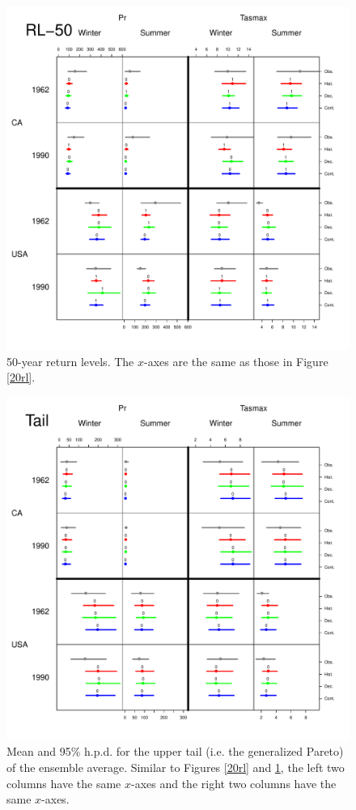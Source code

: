 \documentclass[12pt]{article}
\begin{document}
\begin{figure}
\begin{center}
\includegraphics[scale=0.72]{figs/rl50.pdf}
\end{center}
\caption{50-year return levels. The $x$-axes are the same as those in Figure \ref{20rl}.}
\label{50rl}
\end{figure}

\begin{figure}
\begin{center}
\includegraphics[scale=0.72]{figs/tail.pdf}
\end{center}
\caption{Mean and 95\% h.p.d. for the upper tail (i.e. the generalized Pareto) of the ensemble average. Similar to Figures \ref{20rl} and \ref{50rl}, the left two columns have the same $x$-axes and the right two columns have the same $x$-axes.}
\label{tail}
\end{figure}
\end{document}
